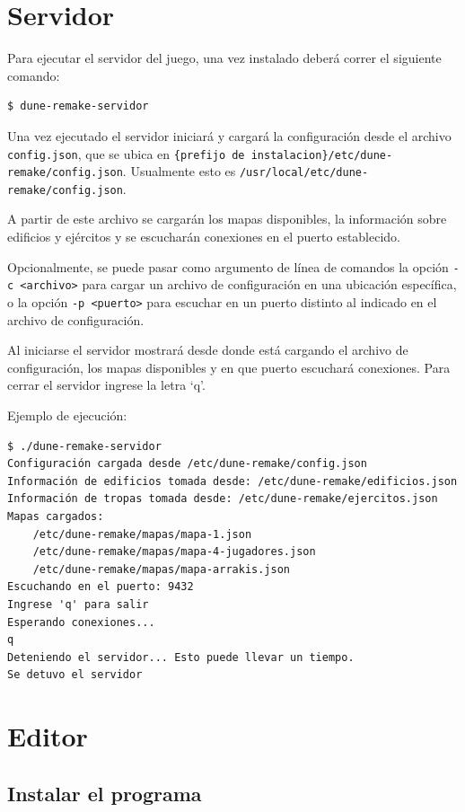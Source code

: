 \documentclass[titlepage,a4paper,12pt]{article}
\begin{document}
\newpage
\section{Servidor}
Para ejecutar el servidor del juego, una vez instalado deberá correr el siguiente comando:
\begin{verbatim}
$ dune-remake-servidor
\end{verbatim}

Una vez ejecutado el servidor iniciará y cargará la configuración desde el archivo \texttt{config.json}, que se ubica en \texttt{\{prefijo de instalacion\}/etc/dune-remake/config.json}. Usualmente esto es \texttt{/usr/local/etc/dune-remake/config.json}.

A partir de este archivo se cargarán los mapas disponibles, la información sobre edificios y ejércitos y se escucharán conexiones en el puerto establecido.

Opcionalmente, se puede pasar como argumento de línea de comandos la opción \texttt{-c <archivo>} para cargar un archivo de configuración en una ubicación específica, o la opción \texttt{-p <puerto>} para escuchar en un puerto distinto al indicado en el archivo de configuración.

Al iniciarse el servidor mostrará desde donde está cargando el archivo de configuración, los mapas disponibles y en que puerto escuchará conexiones. Para cerrar el servidor ingrese la letra `q'.

Ejemplo de ejecución:
\begin{verbatim}
$ ./dune-remake-servidor
Configuración cargada desde /etc/dune-remake/config.json
Información de edificios tomada desde: /etc/dune-remake/edificios.json
Información de tropas tomada desde: /etc/dune-remake/ejercitos.json
Mapas cargados: 
	/etc/dune-remake/mapas/mapa-1.json
	/etc/dune-remake/mapas/mapa-4-jugadores.json
	/etc/dune-remake/mapas/mapa-arrakis.json
Escuchando en el puerto: 9432
Ingrese 'q' para salir
Esperando conexiones...
q
Deteniendo el servidor... Esto puede llevar un tiempo.
Se detuvo el servidor
\end{verbatim}

\newpage
\section{Editor}

\subsection{Instalar el programa}
\end{document}
